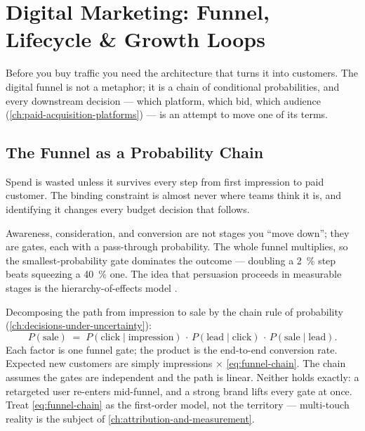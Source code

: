 \chapter{Digital Marketing: Funnel, Lifecycle \& Growth Loops}\label{ch:digital-funnel-and-crm}


Before you buy traffic you need the architecture that turns it into customers. The digital funnel is not a metaphor; it is a chain of conditional probabilities, and every downstream decision --- which platform, which bid, which audience (\cref{ch:paid-acquisition-platforms}) --- is an attempt to move one of its terms.

\section{The Funnel as a Probability Chain}\label{sec:funnel-chain}

Spend is wasted unless it survives every step from first impression to paid customer. The binding constraint is almost never where teams think it is, and identifying it changes every budget decision that follows.

Awareness, consideration, and conversion are not stages you ``move down''; they are gates, each with a pass-through probability. The whole funnel multiplies, so the smallest-probability gate dominates the outcome --- doubling a \qty{2}{\percent} step beats squeezing a \qty{40}{\percent} one. The idea that persuasion proceeds in measurable stages is the hierarchy-of-effects model \parencite{lavidge1961model,barry1987development}.

Decomposing the path from impression to sale by the chain rule of probability (\cref{ch:decisions-under-uncertainty}):
\begin{equation}\label{eq:funnel-chain}
  P(\text{sale}) \;=\; P(\text{click}\mid\text{impression})\,\cdot\,P(\text{lead}\mid\text{click})\,\cdot\,P(\text{sale}\mid\text{lead}).
\end{equation}
Each factor is one funnel gate; the product is the end-to-end conversion rate. Expected new customers are simply impressions $\times$ \cref{eq:funnel-chain}. The chain assumes the gates are independent and the path is linear. Neither holds exactly: a retargeted user re-enters mid-funnel, and a strong brand lifts every gate at once. Treat \cref{eq:funnel-chain} as the first-order model, not the territory --- multi-touch reality is the subject of \cref{ch:attribution-and-measurement}.

